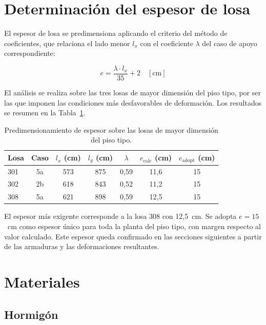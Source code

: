 \section{Determinación del espesor de losa}
\label{sec:espesor-losa}
 
El espesor de losa se predimensiona aplicando el criterio del método de coeficientes, que relaciona el lado menor $l_x$ con el coeficiente $\lambda$ del caso de apoyo correspondiente:
 
\begin{equation}
    e = \frac{\lambda \cdot l_x}{35} + 2 \quad [\text{cm}]
\end{equation}
 
El análisis se realiza sobre las tres losas de mayor dimensión del piso tipo, por ser las que imponen las condiciones más desfavorables de deformación. Los resultados se resumen en la Tabla~\ref{tab:espesor-losa}.
 
\begin{table}[h!]
\centering
\caption{Predimensionamiento de espesor sobre las losas de mayor dimensión del piso tipo.}
\label{tab:espesor-losa}
\begin{tabular}{lcccccc}
\toprule
Losa & Caso & $l_x$ (cm) & $l_y$ (cm) & $\lambda$ & $e_{\text{calc}}$ (cm) & $e_{\text{adopt}}$ (cm) \\
\midrule
301 & 5a & 573 & 875 & 0{,}59 & 11{,}6 & 15 \\
302 & 2b & 618 & 843 & 0{,}52 & 11{,}2 & 15 \\
308 & 5a & 621 & 898 & 0{,}59 & 12{,}5 & 15 \\
\bottomrule
\end{tabular}
\end{table}
 
El espesor más exigente corresponde a la losa 308 con 12{,}5~cm. Se adopta $e = 15$~cm como espesor único para toda la planta del piso tipo, con margen respecto al valor calculado. Este espesor queda confirmado en las secciones siguientes a partir de las armaduras y las deformaciones resultantes.
 
\section{Materiales}
\label{sec:materiales}
 
\subsection{Hormigón}
 
